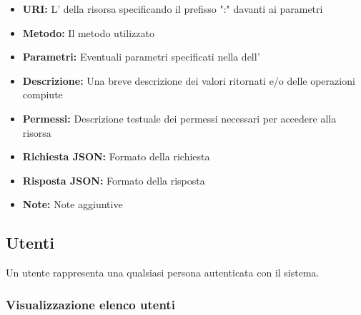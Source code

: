         \begin{itemize}
            \item \textbf{URI:} L' della risorsa specificando il prefisso
                ":" davanti ai parametri
            \item \textbf{Metodo:} Il metodo  utilizzato
            \item \textbf{Parametri:} Eventuali parametri specificati nella 
                dell'
            \item \textbf{Descrizione:} Una breve descrizione dei valori ritornati e/o delle
                operazioni compiute
            \item \textbf{Permessi:} Descrizione testuale dei permessi necessari
                per accedere alla risorsa
            \item \textbf{Richiesta JSON:} Formato della richiesta 
            \item \textbf{Risposta JSON:} Formato della risposta 
            \item \textbf{Note:} Note aggiuntive
        \end{itemize}

\subsection{Utenti}

    Un utente rappresenta una qualsiasi persona autenticata con il sistema.

    \subsubsection{Visualizzazione elenco utenti}

